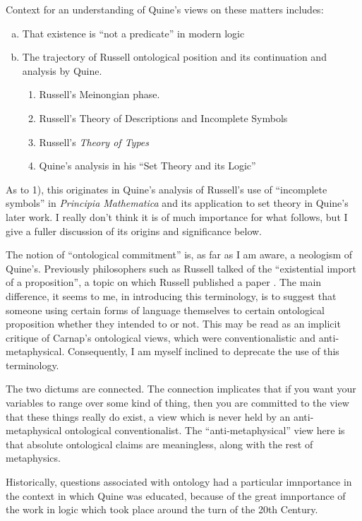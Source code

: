 \documentclass[10pt,titlepage]{article}
\begin{document}
Context for an understanding of Quine's views on these matters includes:
\begin{enumerate}[(a)]
\item That existence is ``not a predicate'' in modern logic
\item The trajectory of Russell ontological position and its continuation and analysis by Quine. 
  \begin{enumerate}[i]
  \item Russell's Meinongian phase.
  \item Russell's Theory of Descriptions \cite{russell1956,russellOD} and Incomplete Symbols \cite{russell10}
  \item Russell's {\it Theory of Types} \cite{russell1908}
  \item Quine's analysis in his ``Set Theory and its Logic'' \cite{quineSTAIL}
  \end{enumerate}
\end{enumerate}

As to 1), this originates in Quine's analysis of Russell's use of ``incomplete symbols'' in \emph{Principia Mathematica} \cite{russell10} and its application to set theory in Quine's later work.
I really don't think it is of much importance for what follows, but I give a fuller discussion of its origins and significance below.

The notion of ``ontological commitment'' is, as far as I am aware, a neologism of Quine's.
Previously philosophers such as Russell talked of the ``existential import of a proposition'', a topic on which Russell published a paper \cite{russell-existential}.
The main difference, it seems to me, in introducing this terminology, is to suggest that someone using certain forms of language themselves to certain ontological proposition whether they intended to or not.
This may be read as an implicit critique of Carnap's ontological views, which were conventionalistic and anti-metaphysical.
Consequently, I am myself inclined to deprecate the use of this terminology.

The two dictums are connected.
The connection implicates that if you want your variables to range over some kind of thing, then you are committed to the view that these things really do exist, a view which is never held by an anti-metaphysical ontological conventionalist.
The ``anti-metaphysical'' view here is that absolute ontological claims are meaningless, along with the rest of metaphysics.

Historically, questions associated with ontology had a particular imnportance in the context in which Quine was educated, because of the great imnportance of the work in logic which took place around the turn of the 20th Century.
\end{document}
